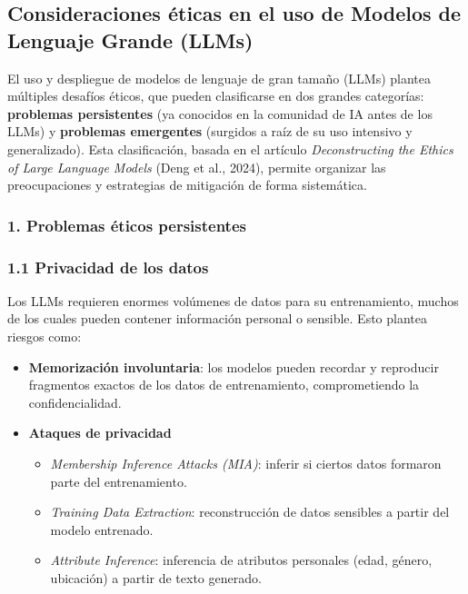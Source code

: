 \documentclass{article}
\begin{document}
\subsection*{Consideraciones éticas en el uso de Modelos de Lenguaje Grande (LLMs)}

El uso y despliegue de modelos de lenguaje de gran tamaño (LLMs) plantea múltiples desafíos éticos, que pueden clasificarse en dos grandes categorías: \textbf{problemas persistentes} (ya conocidos en la comunidad de IA antes de los LLMs) y \textbf{problemas emergentes} (surgidos a raíz de su uso intensivo y generalizado). Esta clasificación, basada en el artículo \emph{Deconstructing the Ethics of Large Language Models} (Deng et al., 2024), permite organizar las preocupaciones y estrategias de mitigación de forma sistemática.

\subsubsection*{1. Problemas éticos persistentes}

\subsubsection*{1.1 Privacidad de los datos}
Los LLMs requieren enormes volúmenes de datos para su entrenamiento, muchos de los cuales pueden contener información personal o sensible. Esto plantea riesgos como:
\begin{itemize}
    \item \textbf{Memorización involuntaria}: los modelos pueden recordar y reproducir fragmentos exactos de los datos de entrenamiento, comprometiendo la confidencialidad.
    \item \textbf{Ataques de privacidad}
    \begin{itemize}
        \item \emph{Membership Inference Attacks (MIA)}: inferir si ciertos datos formaron parte del entrenamiento.
        \item \emph{Training Data Extraction}: reconstrucción de datos sensibles a partir del modelo entrenado.
        \item \emph{Attribute Inference}: inferencia de atributos personales (edad, género, ubicación) a partir de texto generado.
    \end{itemize}
\end{itemize}
\end{document}
